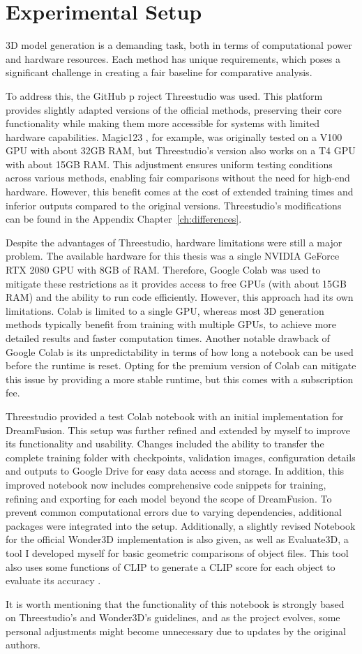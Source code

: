 \section{Experimental Setup}\label{Setup}

3D model generation is a demanding task, both in terms of computational power and hardware resources. Each method has unique requirements, which poses a significant challenge in creating a fair baseline for comparative analysis.

To address this, the GitHub p roject Threestudio \citep{threestudio2023} was used. This platform provides slightly adapted versions of the official methods, preserving their core functionality while making them more accessible for systems with limited hardware capabilities. Magic123 \citep{qian2023magic123}, for example, was originally tested on a V100 GPU with about 32GB RAM, but Threestudio's version also works on a T4 GPU with about 15GB RAM\@. This adjustment ensures uniform testing conditions across various methods, enabling fair comparisons without the need for high-end hardware. However, this benefit comes at the cost of extended training times and inferior outputs compared to the original versions. Threestudio's modifications can be found in the Appendix Chapter~\ref{ch:differences}. 

Despite the advantages of Threestudio, hardware limitations were still a major problem. The available hardware for this thesis was a single NVIDIA GeForce RTX 2080 GPU with 8GB of RAM\@. Therefore, Google Colab \citep{googlecolab} was used to mitigate these restrictions as it provides access to free GPUs (with about 15GB RAM) and the ability to run code efficiently. However, this approach had its own limitations. Colab is limited to a single GPU, whereas most 3D generation methods typically benefit from training with multiple GPUs, to achieve more detailed results and faster computation times. Another notable drawback of Google Colab is its unpredictability in terms of how long a notebook can be used before the runtime is reset. Opting for the premium version of Colab can mitigate this issue by providing a more stable runtime, but this comes with a subscription fee.

Threestudio provided a test Colab notebook with an initial implementation for DreamFusion. This setup was further refined and extended by myself to improve its functionality and usability. Changes included the ability to transfer the complete training folder with checkpoints, validation images, configuration details and outputs to Google Drive for easy data access and storage. In addition, this improved notebook now includes comprehensive code snippets for training, refining and exporting for each model beyond the scope of DreamFusion. To prevent common computational errors due to varying dependencies, additional packages were integrated into the setup. 
Additionally, a slightly revised Notebook for the official Wonder3D implementation \citep{long2023wonder3d} is also given, as well as Evaluate3D, a tool I developed myself for basic geometric comparisons of object files. This tool also uses some functions of CLIP to generate a CLIP score for each object to evaluate its accuracy \citep{radfordCLIP}.

It is worth mentioning that the functionality of this notebook is strongly based on Threestudio's and Wonder3D's guidelines, and as the project evolves, some personal adjustments might become unnecessary due to updates by the original authors.